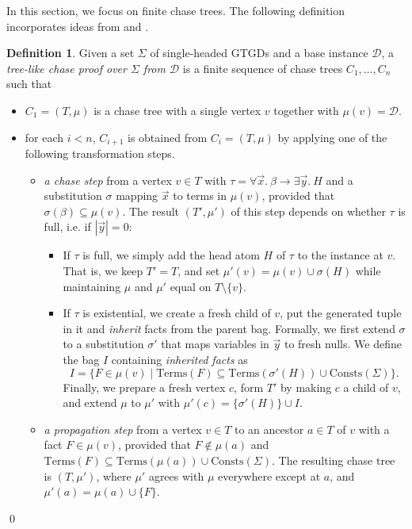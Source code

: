 \documentclass[12pt]{report}
\theoremstyle{plain}
\theoremstyle{definition}
\newtheorem{definition}[theorem]{Definition}
\def\Consts{{\mathrm{Consts}}}
\def\Terms{{\mathrm{Terms}}}
\begin{document}
In this section, we focus on finite chase trees. The following definition incorporates ideas from \cite{benedikt_buron_germano_kappelmann_motik_2022} and \cite{kappelmann_2019}.

\begin{definition}
\label{tree-like-chase-proof}
  Given a set $\Sigma$ of single-headed GTGDs and a base instance $\mathcal{D}$, a \emph{tree-like chase proof over $\Sigma$ from $\mathcal{D}$} is a finite sequence of chase trees $C_1, \ldots, C_n$ such that
  \begin{itemize}
    \item $C_1 = (T, \mu)$ is a chase tree with a single vertex $v$ together with $\mu(v) = \mathcal{D}$.
    \item for each $i < n$, $C_{i + 1}$ is obtained from $C_i = (T, \mu)$ by applying one of the following transformation steps.
    \begin{itemize}
      \item \emph{a chase step} from a vertex $v \in T$ with $\tau = \forall \vec{x}.\ \beta \rightarrow \exists \vec{y}.\ H$ and a substitution $\sigma$ mapping $\vec{x}$ to terms in $\mu(v)$, provided that $\sigma(\beta) \subseteq \mu(v)$. The result $(T', \mu')$ of this step depends on whether $\tau$ is full, i.e. if $|\vec{y}| = 0$:
      \begin{itemize}
        \item If $\tau$ is full, we simply add the head atom $H$ of $\tau$ to the instance at $v$. That is, we keep $T' = T$, and set $\mu'(v) = \mu(v) \cup \sigma(H)$ while maintaining $\mu$ and $\mu'$ equal on $T \setminus \{v\}$.
        \item If $\tau$ is existential, we create a fresh child of $v$, put the generated tuple in it and \emph{inherit} facts from the parent bag. Formally, we first extend $\sigma$ to a substitution $\sigma'$ that maps variables in $\vec{y}$ to fresh nulls. We define the bag $I$ containing \emph{inherited facts} as $$I = \{ F \in \mu(v) \mid \Terms(F) \subseteq \Terms(\sigma'(H)) \cup \Consts(\Sigma) \}.$$ Finally, we prepare a fresh vertex $c$, form $T'$ by making $c$ a child of $v$, and extend $\mu$ to $\mu'$ with $\mu'(c) = \{\sigma'(H)\} \cup I$.
      \end{itemize}
      \item \emph{a propagation step} from a vertex $v \in T$ to an ancestor $a \in T$ of $v$ with a fact $F \in \mu(v)$, provided that $F \not\in \mu(a)$ and $\Terms(F) \subseteq \Terms(\mu(a)) \cup \Consts(\Sigma)$. The resulting chase tree is $(T, \mu')$, where $\mu'$ agrees with $\mu$ everywhere except at $a$, and $\mu'(a) = \mu(a) \cup \{F\}$.
    \end{itemize}
  \end{itemize}
  \qed
\end{definition}
\end{document}

